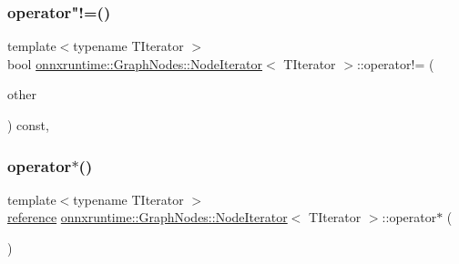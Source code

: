 \subsubsection{\texorpdfstring{operator"!=()}{operator!=()}}
{\footnotesize\ttfamily template$<$typename T\+Iterator $>$ \\
bool \mbox{\hyperlink{classonnxruntime_1_1GraphNodes_1_1NodeIterator}{onnxruntime\+::\+Graph\+Nodes\+::\+Node\+Iterator}}$<$ T\+Iterator $>$\+::operator!= (\begin{DoxyParamCaption}\item[{const \mbox{\hyperlink{classonnxruntime_1_1GraphNodes_1_1NodeIterator}{Node\+Iterator}}$<$ T\+Iterator $>$ \&}]{other }\end{DoxyParamCaption}) const\hspace{0.3cm}{\ttfamily [inline]}, {\ttfamily [noexcept]}}

\mbox{\label{classonnxruntime_1_1GraphNodes_1_1NodeIterator_a40cd12025be279ba688d4eb372af0d03}} 
\subsubsection{\texorpdfstring{operator$\ast$()}{operator*()}}
{\footnotesize\ttfamily template$<$typename T\+Iterator $>$ \\
\mbox{\hyperlink{classonnxruntime_1_1GraphNodes_1_1NodeIterator_ad66278df7151f4ed78d6191f3483e435}{reference}} \mbox{\hyperlink{classonnxruntime_1_1GraphNodes_1_1NodeIterator}{onnxruntime\+::\+Graph\+Nodes\+::\+Node\+Iterator}}$<$ T\+Iterator $>$\+::operator$\ast$ (\begin{DoxyParamCaption}{ }\end{DoxyParamCaption})\hspace{0.3cm}{\ttfamily [inline]}}

\mbox{\label{classonnxruntime_1_1GraphNodes_1_1NodeIterator_ac8f1faed80f39d6f8ce45d4797957cde}} 
